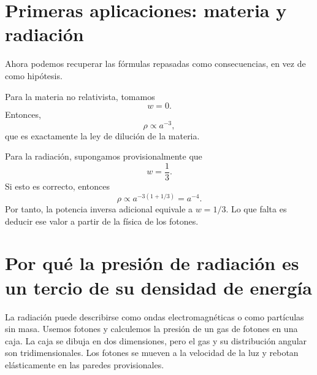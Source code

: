 \section{Primeras aplicaciones: materia y radiación}

Ahora podemos recuperar las fórmulas repasadas como consecuencias, en vez de como hipótesis.

Para la materia no relativista, tomamos
\begin{equation}
w=0.
\end{equation}
Entonces,
\begin{equation}
\rho\propto a^{-3},
\end{equation}
que es exactamente la ley de dilución de la materia.

Para la radiación, supongamos provisionalmente que
\begin{equation}
w=\frac13.
\end{equation}
Si esto es correcto, entonces
\begin{equation}
\rho\propto a^{-3(1+1/3)}=a^{-4}.
\end{equation}
Por tanto, la potencia inversa adicional equivale a \(w=1/3\). Lo que falta es deducir ese valor a partir de la física de los fotones.

\section{Por qué la presión de radiación es un tercio de su densidad de energía}

La radiación puede describirse como ondas electromagnéticas o como partículas sin masa. Usemos fotones y calculemos la presión de un gas de fotones en una caja. La caja se dibuja en dos dimensiones, pero el gas y su distribución angular son tridimensionales. Los fotones se mueven a la velocidad de la luz y rebotan elásticamente en las paredes provisionales.


